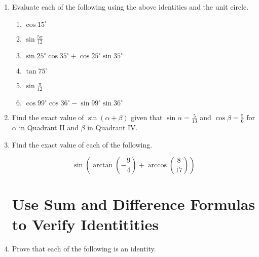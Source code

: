 \documentclass[11pt]{article}
\begin{document}
\begin{enumerate}
\vspace{-.1in}
\item Evaluate each of the following using the above identities and the unit circle.


\begin{enumerate}
\item $\cos 15^{\circ}$
\vfill

\item $\sin \frac{5\pi}{12}$
\vfill

\newpage

\item $\sin 25^{\circ}\cos 35^{\circ} +\cos 25^{\circ}\sin 35^{\circ}$
\vfill

\item $\tan 75^{\circ}$
\vfill

\item $\sin \frac{\pi}{12}$
\vfill
 
\item $\cos 99^{\circ}\cos 36^{\circ}-\sin 99^{\circ}\sin 36^{\circ}$
\vfill

\end{enumerate}

\newpage



\item Find the exact value of $\sin (\alpha + \beta)$ given that $\sin \alpha = \frac{5}{13}$ and $\cos \beta = \frac{5}{6}$ for $\alpha$ in Quadrant II and $\beta$ in Quadrant IV.
\vfill



\item Find the exact value of each of the following.

$$\sin \left( \arctan \left(-\frac{9}{4}\right)+\arccos \left(\frac{8}{17}\right)\right)$$
\vfill



\newpage

\section{Use Sum and Difference Formulas to Verify Identitities}
\item Prove that each of the following is an identity.


\end{enumerate}
\end{document}
